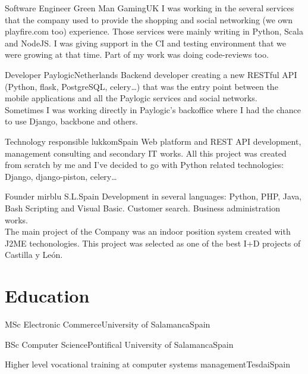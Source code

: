 \documentclass[12pt, a4paper, sans]{moderncv}
\begin{document}
{Software Engineer}
{Green Man Gaming}{UK}{}
{I was working in the several services that the company used to provide the
shopping and social networking (we own playfire.com too) experience. Those
services were mainly writing in Python, Scala and NodeJS. I was giving support
in the CI and testing environment that we were growing at that time. Part of my
work was doing code-reviews too.\\}

{Developer}
{Paylogic}{Netherlands}{}
{Backend developer creating a new RESTful API (Python, flask, PostgreSQL,
celery\ldots) that was the entry point between the mobile applications and all
the Paylogic services and social networks.\\Sometimes I was working directly in
Paylogic's backoffice where I had the chance to use Django, backbone and others.\\}

{Technology responsible}
{lukkom}{Spain}{}
{Web platform and REST API development, management consulting and secondary IT
works. All this project was created from scratch by me and I've decided to go
with Python related technologies: Django, django-piston, celery\ldots\\}

{Founder}
{mirblu S.L.}{Spain}{}
{Development in several languages: Python, PHP, Java, Bash Scripting and Visual
Basic. Customer search. Business administration works.\\The main project of the
Company was an indoor position system created with J2ME techonologies. This
project was selected as one of the best I+D projects of Castilla y León.\\}


%
%

\section{Education}
{MSc Electronic Commerce}{University of Salamanca}{Spain}{}{}

{BSc Computer Science}{Pontifical University of Salamanca}{Spain}{}{}

{Higher level vocational training at computer systems management}{Tesdai}{Spain}{}{}
\end{document}
